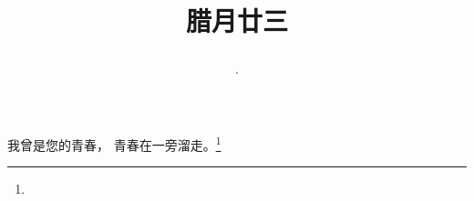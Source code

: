 \title{\date[d=2,m=2,y=2024][year:cn-y,年,month:cn,day:cn,日,·,weekday]·腊月廿三 }
我曾是您的青春， 青春在一旁溜走。\footnote{ }

